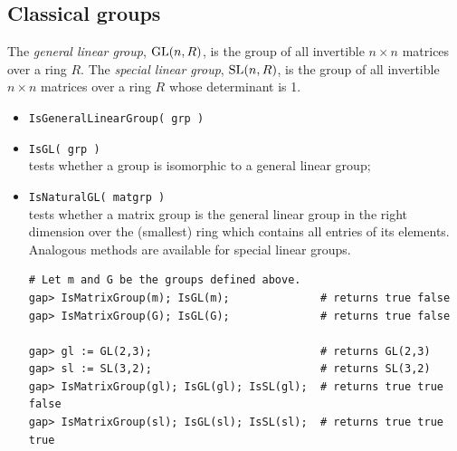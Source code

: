 \subsection{Classical groups}
The \emph{general linear group}, $\mathrm{GL}(n, R)$, is the group of all invertible
$n\times n$ matrices over a ring $R$. 
The \emph{special linear group}, $\mathrm{SL}(n,R)$, is the group of all invertible $n\times
n$ matrices over a ring $R$ whose determinant is 1. 
\begin{itemize}
\item {\tt IsGeneralLinearGroup( grp )}
\item {\tt IsGL( grp )}\\
tests whether a group is isomorphic to a general linear group; 
\item {\tt IsNaturalGL( matgrp )}\\
tests whether a matrix group is the general linear group in the right dimension over the
(smallest) ring which contains all entries of its elements.
\\[4pt]
Analogous methods are available for special linear groups.
{\codesize
\begin{verbatim}
# Let m and G be the groups defined above.
gap> IsMatrixGroup(m); IsGL(m);              # returns true false
gap> IsMatrixGroup(G); IsGL(G);              # returns true false

gap> gl := GL(2,3);                          # returns GL(2,3)
gap> sl := SL(3,2);                          # returns SL(3,2)
gap> IsMatrixGroup(gl); IsGL(gl); IsSL(gl);  # returns true true false
gap> IsMatrixGroup(sl); IsGL(sl); IsSL(sl);  # returns true true true
\end{verbatim}}


\end{itemize}
